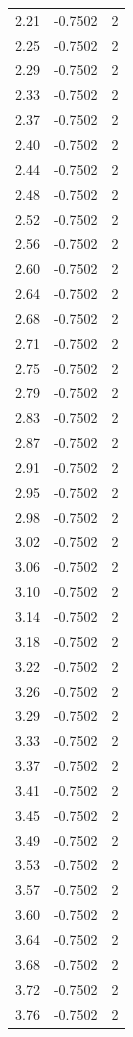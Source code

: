 \begin{longtable}{lrr}
  2.21 & -0.7502 & 2 \\
  2.25 & -0.7502 & 2 \\
  2.29 & -0.7502 & 2 \\
  2.33 & -0.7502 & 2 \\
  2.37 & -0.7502 & 2 \\
  2.40 & -0.7502 & 2 \\
  2.44 & -0.7502 & 2 \\
  2.48 & -0.7502 & 2 \\
  2.52 & -0.7502 & 2 \\
  2.56 & -0.7502 & 2 \\
  2.60 & -0.7502 & 2 \\
  2.64 & -0.7502 & 2 \\
  2.68 & -0.7502 & 2 \\
  2.71 & -0.7502 & 2 \\
  2.75 & -0.7502 & 2 \\
  2.79 & -0.7502 & 2 \\
  2.83 & -0.7502 & 2 \\
  2.87 & -0.7502 & 2 \\
  2.91 & -0.7502 & 2 \\
  2.95 & -0.7502 & 2 \\
  2.98 & -0.7502 & 2 \\
  3.02 & -0.7502 & 2 \\
  3.06 & -0.7502 & 2 \\
  3.10 & -0.7502 & 2 \\
  3.14 & -0.7502 & 2 \\
  3.18 & -0.7502 & 2 \\
  3.22 & -0.7502 & 2 \\
  3.26 & -0.7502 & 2 \\
  3.29 & -0.7502 & 2 \\
  3.33 & -0.7502 & 2 \\
  3.37 & -0.7502 & 2 \\
  3.41 & -0.7502 & 2 \\
  3.45 & -0.7502 & 2 \\
  3.49 & -0.7502 & 2 \\
  3.53 & -0.7502 & 2 \\
  3.57 & -0.7502 & 2 \\
  3.60 & -0.7502 & 2 \\
  3.64 & -0.7502 & 2 \\
  3.68 & -0.7502 & 2 \\
  3.72 & -0.7502 & 2 \\
  3.76 & -0.7502 & 2 \\

\end{longtable}
